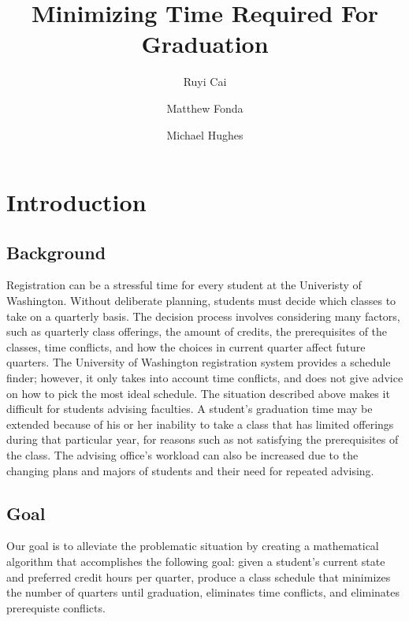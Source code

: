 \documentclass[11pt]{article} %
\title{Minimizing Time Required For Graduation}
\author{Ruyi Cai \and Matthew Fonda \and Michael Hughes}
\begin{document}
\maketitle

\tableofcontents
\pagebreak




\section{Introduction}
\subsection{Background}
Registration can be a stressful time for every student at the Univeristy of Washington. Without deliberate planning, students must decide which classes to take on a quarterly basis. The decision process involves considering many factors, such as quarterly class offerings, the amount of credits, the prerequisites of the classes, time conflicts, and how the choices in current quarter affect future quarters. The University of Washington registration system provides a schedule finder; however, it only takes into account time conflicts, and does not give advice on how to pick the most ideal schedule. The situation described above makes it difficult for students advising faculties. A student's graduation time may be extended because of his or her inability to take a class that has limited offerings during that particular year, for reasons such as not satisfying the prerequisites of the class. The advising office’s workload can also be increased due to the changing plans and majors of students and their need for repeated advising. 

\subsection{Goal}
Our goal is to alleviate the problematic situation by creating a mathematical algorithm that accomplishes the following goal: given a student's current state and preferred credit hours per quarter, produce a class schedule that minimizes the number of quarters until graduation, eliminates time conflicts, and eliminates prerequiste conflicts. 
\end{document}
